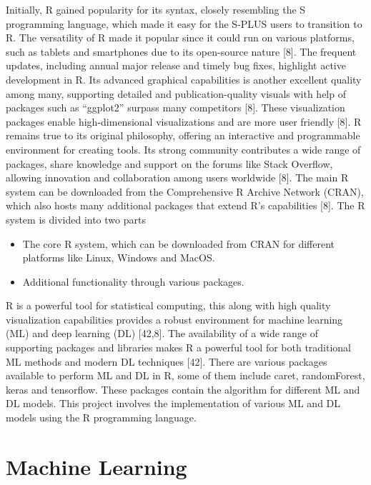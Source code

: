 \documentclass[12pt,a4paper]{article}
\begin{document}
Initially, R gained popularity for its syntax, closely resembling the S programming language, which made it easy for the S-PLUS users to transition to R. The versatility of R made it popular since it could run on various platforms, such as tablets and smartphones due to its open-source nature [8]. 
The frequent updates, including annual major release and timely bug fixes, highlight active development in R. Its advanced graphical capabilities is another excellent quality among many, supporting detailed and publication-quality visuals with help of packages such as “ggplot2” surpass many competitors [8].
These visualization packages enable high-dimensional visualizations and are more user friendly [8]. R remains true to its original philosophy, offering an interactive and programmable environment for creating tools. Its strong community contributes a wide range of packages, share knowledge and support on the 
forums like Stack Overflow, allowing innovation and collaboration among users worldwide [8]. The main R system can be downloaded from the Comprehensive R Archive Network (CRAN), which also hosts many additional packages that extend R’s capabilities [8]. The R system is divided into two parts \\

\begin{itemize}
    \item The core R system, which can be downloaded from CRAN for different platforms like Linux, Windows and MacOS.
    \item Additional functionality through various packages.
\end{itemize}

R is a powerful tool for statistical computing, this along with high quality visualization capabilities provides a robust environment for machine learning (ML) and deep learning (DL) [42,8]. The availability of a wide range of supporting packages and libraries makes R a powerful tool for both traditional ML methods and modern DL techniques [42]. There are various packages available to perform ML and DL in R, some of them include caret, randomForest, keras and tensorflow. These packages contain the algorithm for different  ML and DL models. This project involves the implementation of various ML and DL models using the R programming language. \\

\section{Machine Learning}
\end{document}
